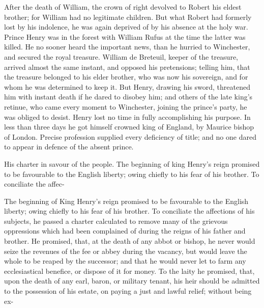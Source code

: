 \documentclass{article}
\begin{document}
After the death of William, the crown of right devolved to Robert his eldest brother; for William had no legitimate children. But what Robert had formerly lost by his indolence, he was again deprived of by his absence at the holy war. Prince Henry was in the forest with William Rufus at the time the latter was killed. He no sooner heard the important news, than he hurried to Winchester, and secured the royal treasure. William de Breteuil, keeper of the treasure, arrived almost the same instant, and opposed his pretensions; telling him, that the treasure belonged to his elder brother, who was now his sovereign, and for whom he was determined to keep it. But Henry, drawing his sword, threatened him with instant death if he dared to disobey him; and others of the late king's retinue, who came every moment to Winchester, joining the prince's party, he was obliged to desist. Henry lost no time in fully accomplishing his purpose. In less than three days he got himself crowned king of England, by Maurice bishop of London. Precise profession supplied every deficiency of title; and no one dared to appear in defence of the absent prince.

His charter in savour of the people. The beginning of king Henry's reign promised to be favourable to the English liberty; owing chiefly to his fear of his brother. To conciliate the affec-

The beginning of King Henry's reign promised to be favourable to the English liberty; owing chiefly to his fear of his brother. To conciliate the affections of his subjects, he passed a charter calculated to remove many of the grievous oppressions which had been complained of during the reigns of his father and brother. He promised, that, at the death of any abbot or bishop, he never would seize the revenues of the fee or abbey during the vacancy, but would leave the whole to be reaped by the successor; and that he would never let to farm any ecclesiastical benefice, or dispose of it for money. To the laity he promised, that, upon the death of any earl, baron, or military tenant, his heir should be admitted to the possession of his estate, on paying a just and lawful relief; without being ex-
\end{document}
